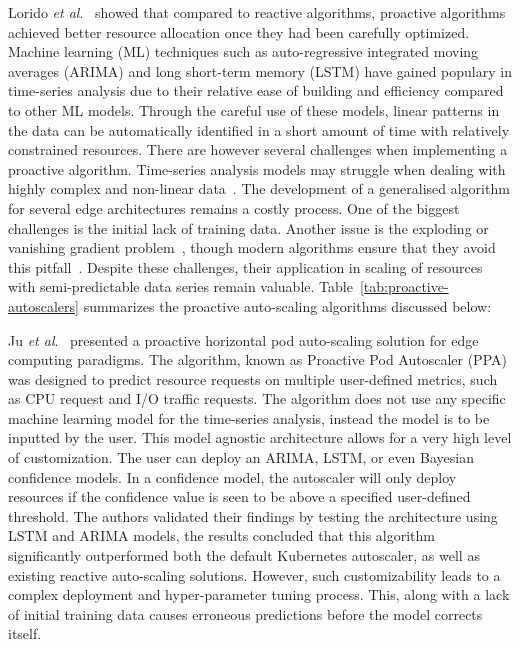 Lorido \textit{et al}.~\cite{lorido2014review} showed that compared to reactive algorithms, proactive algorithms achieved better resource allocation once they had been carefully optimized. Machine learning (ML) techniques such as auto-regressive integrated moving averages (ARIMA) and long short-term memory (LSTM) have gained populary in time-series analysis due to their relative ease of building and efficiency compared to other ML models. Through the careful use of these models, linear patterns in the data can be automatically identified in a short amount of time with relatively constrained resources. There are however several challenges when implementing a proactive algorithm. Time-series analysis models may struggle when dealing with highly complex and non-linear data~\cite{dogani2023auto}. The development of a generalised algorithm for several edge architectures remains a costly process. One of the biggest challenges is the initial lack of training data. Another issue is the exploding or vanishing gradient problem~\cite{pascanu2013difficulty}, though modern algorithms ensure that they avoid this pitfall~\cite{hochreiter2001gradient}. Despite these challenges, their application in scaling of resources with semi-predictable data series remain valuable. Table~\ref{tab:proactive-autoscalers} summarizes the proactive auto-scaling algorithms discussed below:\par

Ju \textit{et al}.~\cite{ju2021proactive} presented a proactive horizontal pod auto-scaling solution for edge computing paradigms. The algorithm, known as Proactive Pod Autoscaler (PPA) was designed to predict resource requests on multiple user-defined metrics, such as CPU request and I/O traffic requests. The algorithm does not use any specific machine learning model for the time-series analysis, instead the model is to be inputted by the user. This model agnostic architecture allows for a very high level of customization. The user can deploy an ARIMA, LSTM, or even Bayesian confidence models. In a confidence model, the autoscaler will only deploy resources if the confidence value is seen to be above a specified user-defined threshold. The authors validated their findings by testing the architecture using LSTM and ARIMA models, the results concluded that this algorithm significantly outperformed both the default Kubernetes autoscaler, as well as existing reactive auto-scaling solutions. However, such customizability leads to a complex deployment and hyper-parameter tuning process. This, along with a lack of initial training data causes erroneous predictions before the model corrects itself.\par

